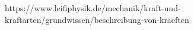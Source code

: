 \documentclass[preview]{standalone}
\begin{document}
\begin{center}
https://www.leifiphysik.de/mechanik/kraft-und-kraftarten/grundwissen/beschreibung-von-kraeften
\end{center}
\end{document}
